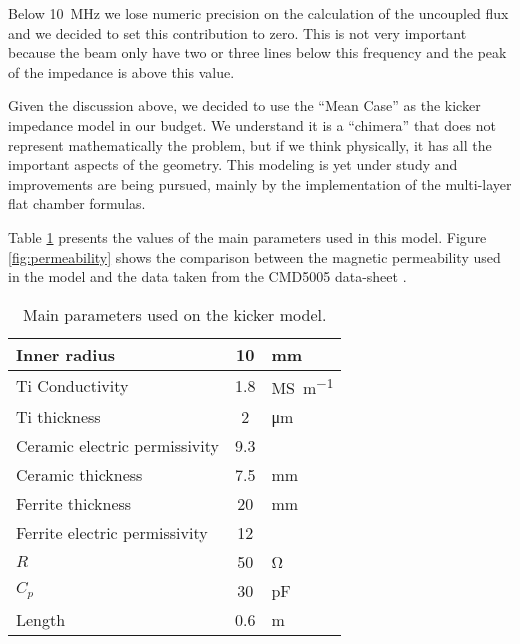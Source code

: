 
Below \SI{10}{\mega\hertz} we lose numeric precision on the calculation of the uncoupled flux and we decided to set this contribution to zero. This is not very important because the beam only have two or three lines below this frequency and the peak of the impedance is above this value.

Given the discussion above, we decided to use the ``Mean Case'' as the kicker impedance model in our budget. We understand it is a ``chimera'' that does not represent mathematically the problem, but if we think physically, it has all the important aspects of the geometry. This modeling is yet under study and improvements are being pursued, mainly by the implementation of the multi-layer flat chamber formulas.

Table \ref{tab:kicker_model_data} presents the values of the main parameters used in this model. Figure \ref{fig:permeability} shows the comparison between the magnetic permeability used in the model and the data taken from the CMD5005 data-sheet \cite{datasheetcmd5005}.

\begin{table}[!t]
 \centering
 \caption{Main parameters used on the kicker model.}
 \label{tab:kicker_model_data}
 \begin{tabular}{lcl}\hline
  Inner radius      &    10                & \si{\milli\meter} \\\hline
  Ti Conductivity\cite{matwebsite} & 1.8& \si{\mega\siemens\per\meter} \\\hline
  Ti thickness &     2             & \si{\micro\meter} \\\hline
  Ceramic electric permissivity & 9.3    & \\\hline
  Ceramic thickness & 7.5             & \si{\milli\meter}\\\hline
  Ferrite thickness & 20            & \si{\milli\meter} \\\hline
  Ferrite electric permissivity & 12 & \\\hline
  $R$               &  50           & \si{\ohm} \\\hline
  $C_p$             &  30          & \si{\pico\farad} \\\hline
  Length                & 0.6                & \si{\meter}   \\\hline
 \end{tabular}
\end{table}


